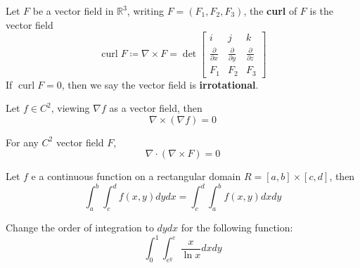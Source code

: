 \documentclass[openany]{book}
\newcommand{\R}{\mathbb{R}}
\newcommand{\curl}{\operatorname{curl}}
\begin{document}
\begin{defn}[curl]
    Let $F$ be a vector field in $\R^3$, writing $F=(F_1,F_2,F_3)$, the \textbf{curl} of $F$ is the vector field 
    \begin{equation*}
        \curl F\coloneq\nabla\times F=\det\begin{bmatrix}
            i&j&k\\
            \frac{\partial}{\partial x}&\frac{\partial}{\partial y}&\frac{\partial}{\partial z}\\
            F_1&F_2&F_3
        \end{bmatrix}
    \end{equation*}
    If $\curl F=0$, then we say the vector field is \textbf{irrotational}.
\end{defn}

\begin{prop}
    Let $f\in C^2$, viewing $\nabla f$ as a vector field, then
    \begin{equation*}
        \nabla\times(\nabla f)=0
    \end{equation*}    
\end{prop}

\begin{prop}
    For any $C^2$ vector field $F$, 
    \begin{equation*}
        \nabla\cdot(\nabla\times F)=0
    \end{equation*}
\end{prop}



\begin{prop}
    Let $f$ e a continuous function on a rectangular domain $R=[a,b]\times[c,d]$, then 
    \begin{equation*}
        \int_a^b\int_c^df(x,y)dydx=\int_c^d\int_a^bf(x,y)dxdy
    \end{equation*}
\end{prop}

\begin{prob}
    Change the order of integration to $dydx$ for the following function:
    \begin{equation*}
        \int_0^1\int_{e^y}^{e}\frac{x}{\ln x}dxdy
    \end{equation*}
\end{prob}
\end{document}
